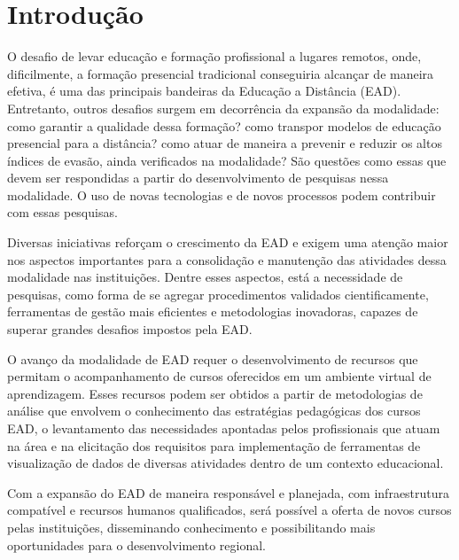 \chapter{Introdução}

O desafio de levar educação e formação profissional a lugares remotos, onde,
dificilmente, a formação presencial tradicional conseguiria alcançar de maneira
efetiva, é uma das principais bandeiras da Educação a Distância (EAD).
Entretanto, outros desafios surgem em decorrência da expansão da modalidade:
como garantir a qualidade dessa formação? como transpor modelos de educação
presencial para a distância? como atuar de maneira a prevenir e reduzir os altos
índices de evasão, ainda verificados na modalidade? São questões como essas que
devem ser respondidas a partir do desenvolvimento de pesquisas nessa modalidade.
O uso de novas tecnologias e de novos processos podem contribuir com essas
pesquisas.

Diversas iniciativas reforçam o crescimento da EAD e exigem uma atenção maior
nos aspectos importantes para a consolidação e manutenção das atividades dessa
modalidade nas instituições. Dentre esses aspectos, está a necessidade de
pesquisas, como forma de se agregar procedimentos validados cientificamente,
ferramentas de gestão mais eficientes e metodologias inovadoras, capazes de
superar grandes desafios impostos pela EAD.

O avanço da modalidade de EAD requer o desenvolvimento de recursos que permitam
o acompanhamento de cursos oferecidos em um ambiente virtual de aprendizagem.
Esses recursos podem ser obtidos a partir de metodologias de análise que
envolvem o conhecimento das estratégias pedagógicas dos cursos EAD, o
levantamento das necessidades apontadas pelos profissionais que atuam na área e
na elicitação dos requisitos para implementação de ferramentas de visualização
de dados de diversas atividades dentro de um contexto educacional.
\cite{ramos2016abordagem}

Com a expansão do EAD de maneira responsável e planejada, com infraestrutura
compatível e recursos humanos qualificados, será possível a oferta de novos
cursos pelas instituições, disseminando conhecimento e possibilitando mais
oportunidades para o desenvolvimento regional.

